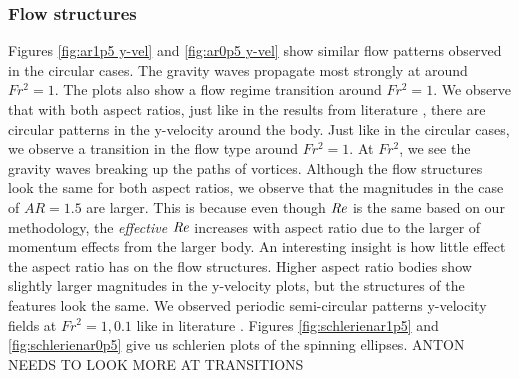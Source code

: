\subsubsection{Flow structures}
Figures \ref{fig:ar1p5 y-vel} and \ref{fig:ar0p5 y-vel} show similar flow patterns observed in the circular cases. The gravity waves propagate most strongly at around $Fr^2 = 1$. The plots also show a flow regime transition around $Fr^2 = 1$. We observe that with both aspect ratios, just like in the results from literature \cite{ortiz-tarin_stratified_2019}, there are circular patterns in the y-velocity around the body. Just like in the circular cases, we observe a transition in the flow type around $Fr^2 = 1$. At $Fr^2$, we see the gravity waves breaking up the paths of vortices.  Although the flow structures look the same for both aspect ratios, we observe that the magnitudes in the case of $AR = 1.5$ are larger. This is because even though $\mathit{Re}$ is the same based on our methodology, the \textit{effective} $\mathit{Re}$ increases with aspect ratio due to the larger of momentum effects from the larger body. An interesting insight is how little effect the aspect ratio has on the flow structures. Higher aspect ratio bodies show slightly larger magnitudes in the y-velocity plots, but the structures of the features look the same. We observed periodic semi-circular patterns y-velocity fields at $Fr^2 = 1, 0.1$ like in literature \cite{ortiz-tarin_stratified_2019}. Figures \ref{fig:schlerienar1p5} and \ref{fig:schlerienar0p5} give us schlerien plots of the spinning ellipses. ANTON NEEDS TO LOOK MORE AT TRANSITIONS
